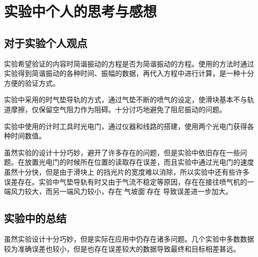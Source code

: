 \documentclass{ctexart}
\begin{document}
\section{实验中个人的思考与感想}
  \subsection{对于实验个人观点}
  实验希望验证的内容时简谐振动的方程是否为简谐振动的方程。使用的方法时通过实验得到简谐振动的各种时间、振幅的数据，再代入方程中进行计算，是一种十分方便的验证方式。

  实验中采用的时气垫导轨的方式，通过气垫不断的喷气的设定，使滑块基本不与轨道摩擦，仅保留空气阻力作为阻碍。十分讨巧地避免了阻尼振动的问题。

  实验中使用的计时工具时光电门，通过仪器和线路的搭建，使用两个光电门获得各种时间数值。

  虽然实验的设计十分巧妙，避开了许多存在的问题，但是实验中依旧存在一些问题。在放置光电门的时候所在位置的读取存在误差，而且实验中通过光电门的速度虽然十分快，但是由于滑块上
  的挡光片的宽度难以消除，所以实验中还有些许多误差存在。实验中气垫导轨有时又由于气流不稳定等原因，存在在接往喷气机的一端风力较大，而另一端风力较小，存在\" 空气坡面\"的存在
  导致误差进一步加大。
  
  \subsection{实验中的总结}
  虽然实验设计十分巧妙，但是实际在应用中仍存在诸多问题。几个实验中多数数据较为准确误差也较小，但是也存在误差较大的数据导致最终和目标相差甚远。
\end{document}
